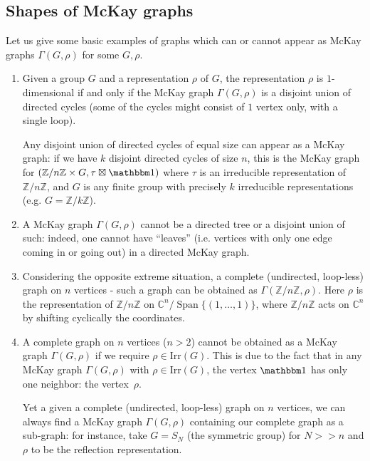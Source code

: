 \documentclass[ALCO]{cedram}
\newcommand{\triv}{{\mathbbm 1}}
\newcommand{\Span}{{\operatorname{Span}}}
\newcommand{\C}{{\mathbb C}}
\newcommand{\Z}{{\mathbb Z}}
\begin{document}
\subsection{Shapes of McKay graphs} Let us give some basic examples of graphs which can or cannot appear as McKay 
graphs $\Gamma(G, \rho)$ for some $G, \rho$.
\begin{exam}
\begin{enumerate}
\item Given a group $G$ and a representation $\rho$ of $G$, the representation 
$\rho$ is $1$-dimensional if and only if the McKay graph $\Gamma(G, \rho)$ is a 
disjoint union of directed cycles (some of the cycles might consist 
of $1$ vertex only, with a single loop). 

Any disjoint union of directed cycles of equal size can appear as a McKay 
graph: 
if we have $k$ disjoint directed cycles of size $n$, this is the 
McKay graph for $(\Z/n\Z \times G, \tau\boxtimes \triv)$ where $\tau$ is an 
irreducible representation of $\Z/n\Z$, and $G$ is any finite group with 
precisely $k$ irreducible representations (e.g. $G=\Z/k\Z$).
 \item  A McKay graph $\Gamma(G, \rho)$ cannot be a directed tree or a 
disjoint union of such: indeed, one cannot have ``leaves'' (i.e. vertices with 
only one edge coming in or going out) in a directed McKay graph.
 \item Considering the opposite extreme situation, a complete (undirected, 
loop-less) graph on $n$ vertices - such a graph can be obtained as 
$\Gamma(\Z/n\Z, \rho)$. Here $\rho$ is the representation of $\Z/n\Z$ on 
$\C^n/\Span\{(1,\ldots, 1)\}$, where $\Z/n\Z$ acts on $\C^n$ by shifting cyclically the 
coordinates. 
 \item A complete graph on $n$ vertices ($n>2$) cannot be obtained as a McKay 
graph $\Gamma(G, \rho)$ if we require $\rho \in \mathrm{Irr}(G)$. This is due to the 
fact that in any McKay graph $\Gamma(G, \rho)$ with $\rho \in \mathrm{Irr}(G)$, the 
vertex $\triv$ has only one neighbor: the vertex~$\rho$.
 
 Yet a given a complete (undirected, loop-less) graph on $n$ vertices, we can 
always find a McKay graph $\Gamma(G, \rho)$  containing our complete graph as a 
sub-graph: for instance, take $G = S_N$ (the symmetric group) for $N>>n$ and 
$\rho$ to be the reflection representation.
\end{enumerate}

\end{exam}
\end{document}
